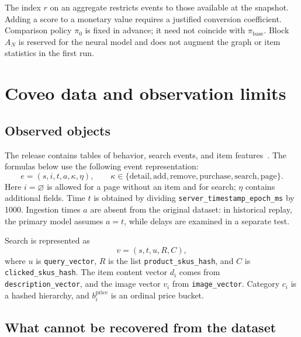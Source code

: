 \documentclass[12pt,a4paper]{article}
\newcommand{\code}[1]{{\ttfamily\small\nolinkurl{#1}}}
\theoremstyle{plainru}
\begin{document}
The index \(r\) on an aggregate restricts events to those available at the snapshot.
Adding a score to a monetary value requires a justified conversion
coefficient. Comparison policy \(\pi_0\) is fixed in advance;
it need not coincide with \(\pi_{\mathrm{base}}\).
Block \(A_N\) is reserved for the neural model and does not augment the graph
or item statistics in the first run.

\section{Coveo data and observation limits}\label{sec:data}

\subsection{Observed objects}

The release contains tables of behavior, search events, and item
features~\cite{coveo-data,coveo-paper}. The formulas below use
the following event representation:
\begin{equation}\label{eq:data-event}
e=(s,i,t,a,\kappa,\eta),\qquad
\kappa\in\{\mathrm{detail},\mathrm{add},\mathrm{remove},
\mathrm{purchase},\mathrm{search},\mathrm{page}\}.
\end{equation}
Here \(i=\varnothing\) is allowed for a page without an item and for search;
\(\eta\) contains additional fields. Time \(t\) is obtained by dividing
\code{server_timestamp_epoch_ms} by 1000. Ingestion times \(a\)
are absent from the original dataset: in historical replay, the primary model
assumes \(a=t\), while delays are examined in a separate test.

Search is represented as
\begin{equation}\label{eq:data-search}
v=(s,t,u,R,C),
\end{equation}
where \(u\) is \code{query_vector}, \(R\) is the list
\code{product_skus_hash}, and \(C\) is \code{clicked_skus_hash}.
The item content vector \(d_i\) comes from
\code{description_vector}, and the image vector \(v_i\) from
\code{image_vector}. Category \(c_i\) is a hashed hierarchy,
and \(b_i^{\mathrm{price}}\) is an ordinal price bucket.

\subsection{What cannot be recovered from the dataset}
\end{document}
